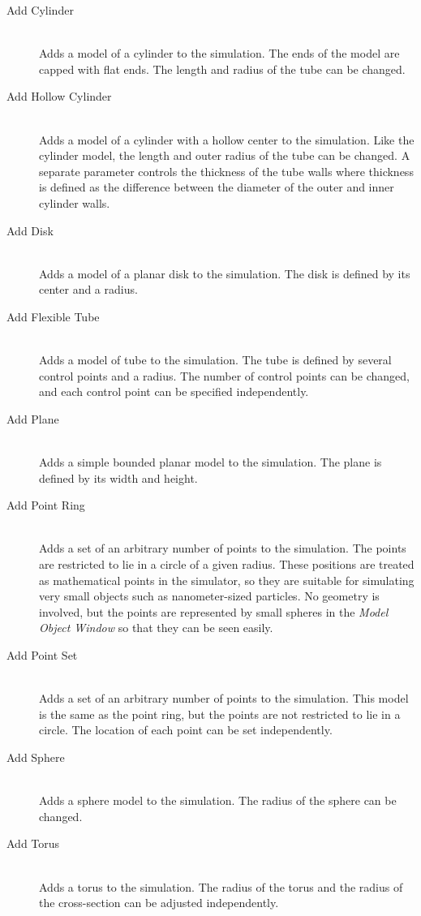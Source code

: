 \documentclass[11pt,titlepage]{article}
\begin{document}
\begin{description}

  \item[Add Cylinder] \hfill \\
  Adds a model of a cylinder to the simulation. The ends of the model are capped with flat ends. The length and radius of the tube can be changed.
  
  \item[Add Hollow Cylinder] \hfill \\
  Adds a model of a cylinder with a hollow center to the simulation. Like the cylinder model, the length and outer radius of the tube can be changed. A separate parameter controls the thickness of the tube walls where thickness is defined as the difference between the diameter of the outer and inner cylinder walls.

  \item[Add Disk] \hfill \\
  Adds a model of a planar disk to the simulation. The disk is defined by its center and a radius.

  \item[Add Flexible Tube] \hfill \\
  Adds a model of tube to the simulation. The tube is defined by several control points and a radius. The number of control points can be changed, and each control point can be specified independently.
  
  \item[Add Plane] \hfill \\
  Adds a simple bounded planar model to the simulation. The plane is defined by its width and height.
  
  \item[Add Point Ring] \hfill \\
  Adds a set of an arbitrary number of points to the simulation. The points are restricted to lie in a circle of a given radius. These positions are treated as mathematical points in the simulator, so they are suitable for simulating very small objects such as nanometer-sized particles. No geometry is involved, but the points are represented by small spheres in the \emph{Model Object Window} so that they can be seen easily.
  
  \item[Add Point Set] \hfill \\
  Adds a set of an arbitrary number of points to the simulation. This model is the same as the point ring, but the points are not restricted to lie in a circle. The location of each point can be set independently.
  
  \item[Add Sphere] \hfill \\
  Adds a sphere model to the simulation. The radius of the sphere can be changed.

  \item[Add Torus] \hfill \\
  Adds a torus to the simulation. The radius of the torus and the radius of the cross-section can be adjusted independently.

\end{description}
\end{document}
